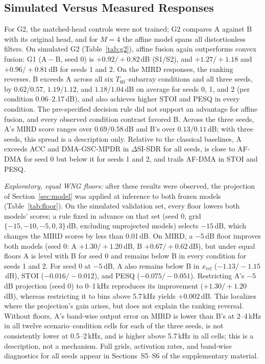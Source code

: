 \documentclass[journal]{IEEEtran}
\newcommand{\supp}{the supplementary material}
\begin{document}
\subsection{Simulated Versus Measured Responses}
\label{sec:measured}
For G2, the matched-head controls were not trained; G2 compares A against B with its original head, and for $M=4$ the affine model spans all distortionless filters. On simulated G2 (Table~\ref{tab:g2}), affine fusion again outperforms convex fusion: G1 ($\mathrm A-\mathrm B$, seed 0) is $+0.92/{+}0.82$\,dB (S1/S2), and $+1.27/{+}1.18$ and $+0.96/{+}0.81$\,dB for seeds 1 and 2. On the MIRD responses, the ranking reverses. B exceeds A across all six $T_{60}$--subarray conditions and all three seeds, by $0.62/0.57$, $1.19/1.12$, and $1.18/1.04$\,dB on average for seeds 0, 1, and 2 (per condition 0.06--2.17\,dB), and also achieves higher STOI and PESQ in every condition. The pre-specified decision rule did not support an advantage for affine fusion, and every observed condition contrast favored B. Across the three seeds, A's MIRD score ranges over $0.69/0.58$\,dB and B's over $0.13/0.11$\,dB; with three seeds, this spread is a description only. Relative to the classical baselines, A exceeds ACC and DMA-GSC-MPDR in $\Delta$SI-SDR for all seeds, is close to AF-DMA for seed 0 but below it for seeds 1 and 2, and trails AF-DMA in STOI and PESQ.

\emph{Exploratory, equal WNG floors:} after these results were observed, the projection of Section~\ref{sec:model} was applied at inference to both frozen models (Table~\ref{tab:floor}). On the simulated validation set, every floor lowers both models' scores; a rule fixed in advance on that set (seed 0, grid $\{-15,-10,-5,0,3\}$\,dB, excluding unprojected models) selects $-15$\,dB, which changes the MIRD scores by less than 0.01\,dB. On MIRD, a $-5$\,dB floor improves both models (seed 0: A $+1.30/{+}1.20$\,dB, B $+0.67/{+}0.62$\,dB), but under equal floors A is level with B for seed 0 and remains below B in every condition for seeds 1 and 2. For seed 0 at $-5$\,dB, A also remains below B in $x_{\mathrm{ref}}$ ($-1.13/{-}1.15$\,dB), STOI ($-0.016/{-}0.012$), and PESQ ($-0.075/{-}0.051$). Restricting A's $-5$\,dB projection (seed 0) to 0--1\,kHz reproduces its improvement ($+1.30/{+}1.20$\,dB), whereas restricting it to bins above 5.7\,kHz yields $+0.002$\,dB. This localizes where the projection's gain arises, but does not explain the ranking reversal. Without floors, A's band-wise output error on MIRD is lower than B's at 2--4\,kHz in all twelve scenario--condition cells for each of the three seeds, is not consistently lower at 0.5--2\,kHz, and is higher above 5.7\,kHz in all cells; this is a description, not a mechanism. Full grids, activation rates, and band-wise diagnostics for all seeds appear in Sections~S5--S6 of \supp.
\end{document}

